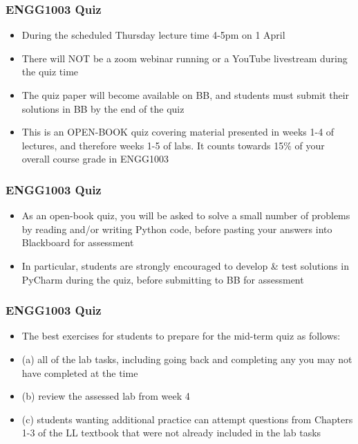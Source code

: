 \documentclass[english,14pt]{beamer}
\begin{document}
\begin{frame}[fragile]
\frametitle{ENGG1003 Quiz}
    \begin{itemize}
		\item During the scheduled Thursday lecture time 4-5pm on 1 April
        \item There will NOT be a zoom webinar running or a YouTube livestream during the quiz time
        \item The quiz paper will become available on BB, and students must submit their solutions in BB by the end of the quiz
        \item This is an OPEN-BOOK quiz covering material presented in weeks 1-4 of lectures, and therefore weeks 1-5 of labs. It counts towards 15\% of your overall course grade in ENGG1003
    \end{itemize}
\end{frame}


\begin{frame}[fragile]
\frametitle{ENGG1003 Quiz}
    \begin{itemize}
        \item As an open-book quiz, you will be asked to solve a small number of problems by reading and/or writing Python code, before pasting your answers into Blackboard for assessment

        \item In particular, students are strongly encouraged to develop \& test solutions in PyCharm during the quiz, before submitting to BB for assessment
    \end{itemize}
\end{frame}

\begin{frame}[fragile]
\frametitle{ENGG1003 Quiz}
    \begin{itemize}
\item The best exercises for students to prepare for the mid-term quiz as follows:

\item (a) all of the lab tasks, including going back and completing any you may not have completed at the time

\item (b) review the assessed lab from week 4

\item (c) students wanting additional practice can attempt questions from Chapters 1-3 of the LL textbook that were not already included in the lab tasks

    \end{itemize}
\end{frame}
\end{document}
